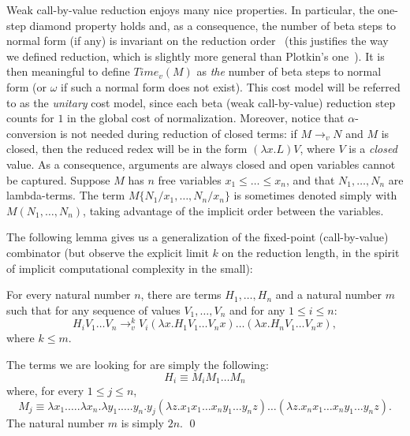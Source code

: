 \documentclass{LMCS}
\newcommand{\varone}{x}
\newcommand{\vartwo}{y}
\newcommand{\varthree}{z}
\newcommand{\lambdaone}{M}
\newcommand{\lambdatwo}{N}
\newcommand{\lambdathree}{L}
\newcommand{\valueone}{V}
\newcommand{\Time}[1]{\mathit{Time}_v(#1)}
\newcommand{\rewrlambdav}{\rightarrow_v}
\newcounter{number}
\begin{document}
\noindent Weak call-by-value reduction enjoys many nice properties. In
particular, the one-step diamond property holds and, as a consequence,
the number of beta steps to normal form (if any) is invariant on the
reduction order~\cite{CIE2006} (this justifies the way we defined
reduction, which is slightly more general than Plotkin's
one~\cite{Plotkin75tcs}). It is then meaningful to define
$\Time{\lambdaone}$ as \emph{the} number of beta steps to normal form
(or $\omega$ if such a normal form does not exist). This cost model
will be referred to as the \emph{unitary} cost model, since each beta
(weak call-by-value) reduction step counts for $1$ in the global cost
of normalization. Moreover, notice that $\alpha$-conversion is not
needed during reduction of closed terms: if
$\lambdaone\rewrlambdav\lambdatwo$ and $\lambdaone$ is closed, then
the reduced redex will be in the form
$(\lambda\varone.\lambdathree)\valueone$, where $\valueone$ is a
\emph{closed} value. As a consequence, arguments are always closed and
open variables cannot be captured. Suppose $\lambdaone$ has $n$ free
variables $\varone_1\leq\ldots\leq\varone_n$, and that
$\lambdatwo_1,\ldots,\lambdatwo_n$ are lambda-terms. The term
$\lambdaone\{\lambdatwo_1/\varone_1,\ldots,\lambdatwo_n/\varone_n\}$
is sometimes denoted simply with
$\lambdaone(\lambdatwo_1,\ldots,\lambdatwo_n)$, taking advantage of
the implicit order between the variables.

The following lemma gives us a generalization of the fixed-point (call-by-value)
combinator (but observe the explicit limit $k$ on the reduction length, 
in the spirit of implicit computational complexity in the small):
\begin{lem}\label{lemma:mfpc}
For every natural number $n$, there are terms $H_1,\ldots,H_n$ and a natural number $m$ such
that for any sequence of values $V_1,\ldots,V_n$ and for any $1\leq i\leq n$:
$$
H_iV_1\ldots V_n\rewrlambdav^k V_i(\lambda x.H_1V_1\ldots V_nx)\ldots(\lambda x.H_nV_1\ldots V_nx),
$$
where $k\leq m$.
\end{lem}
\proof
The terms we are looking for are simply the following:
$$
H_i\equiv\lambdaone_i\lambdaone_1\ldots\lambdaone_n
$$
where, for every $1\leq j\leq n$,
$$
\lambdaone_j\equiv\lambda\varone_1.\ldots.\lambda\varone_n.\lambda\vartwo_1.\ldots.\vartwo_n.\vartwo_j
(\lambda\varthree.\varone_1\varone_1\ldots\varone_n\vartwo_1\ldots\vartwo_n\varthree)
\ldots
(\lambda\varthree.\varone_n\varone_1\ldots\varone_n\vartwo_1\ldots\vartwo_n\varthree).
$$
The natural number $m$ is simply $2n$.
\qed
\end{document}
